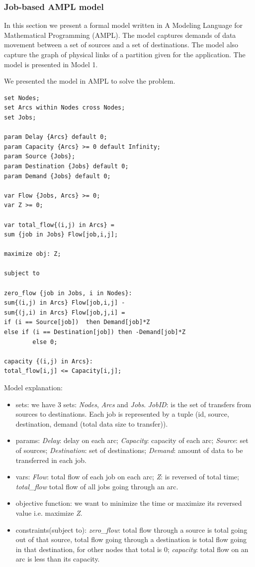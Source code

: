 \subsubsection{Job-based AMPL model}
In this section we present a formal model written in A Modeling Language for Mathematical Programming (AMPL). The model captures demands of data movement between a set of sources and a set of destinations. The model also capture the graph of physical links of a partition given for the application. The model is presented in Model 1.

We presented the model in AMPL to solve the problem.

\begin{verbatim}
set Nodes;
set Arcs within Nodes cross Nodes;
set Jobs;

param Delay {Arcs} default 0;
param Capacity {Arcs} >= 0 default Infinity;
param Source {Jobs};
param Destination {Jobs} default 0;
param Demand {Jobs} default 0;

var Flow {Jobs, Arcs} >= 0;
var Z >= 0;

var total_flow{(i,j) in Arcs} = 
sum {job in Jobs} Flow[job,i,j];

maximize obj: Z;

subject to

zero_flow {job in Jobs, i in Nodes}:
sum{(i,j) in Arcs} Flow[job,i,j] - 
sum{(j,i) in Arcs} Flow[job,j,i] = 
if (i == Source[job])  then Demand[job]*Z 
else if (i == Destination[job]) then -Demand[job]*Z 
        else 0;

capacity {(i,j) in Arcs}:
total_flow[i,j] <= Capacity[i,j];
\end{verbatim}

Model explanation:
\begin{itemize}
\item sets: we have 3 sets: \textit{Nodes}, \textit{Arcs} and \textit{Jobs}. \textit{JobID}: is the set of transfers from sources to destinations. Each job is represented by a tuple (id, source, destination, demand (total data size to transfer)).
\item params: {\it Delay}: delay on each arc; {\it Capacity}: capacity of each arc; {\it Source}: set of sources; {\it Destination}: set of destinations; {\it Demand}: amount of data to be transferred in each job.
\item vars: \textit{Flow}: total flow of each job on each arc; \textit{Z}: is reversed of total time; \textit{total\_flow} total flow of all jobs going through an arc.
\item objective function: we want to minimize the time or maximize its reversed value i.e. maximize \textit{Z}.
\item constraints(subject to): \textit{zero\_flow}: total flow through a source is total going out of that source, total flow going through a destination is total flow going in that destination, for other nodes that total is 0; \textit{capacity}: total flow on an arc is less than its capacity.
\end{itemize}

